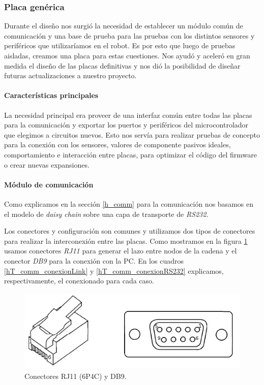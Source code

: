 \subsubsection{Placa gen\'erica}
\label{h_placas_generica}

Durante el dise\~no nos surgi\'o la necesidad de establecer un m\'odulo com\'un de comunicaci\'on y una base de prueba para
las pruebas con los distintos sensores y perif\'ericos que utilizar\'iamos en el robot.
Es por esto que luego de pruebas aisladas, creamos una placa para estas cuestiones.
Nos ayud\'o y aceler\'o en gran medida el dise\~no de las placas definitivas y nos di\'o la posibilidad de dise\~nar futuras
actualizaciones a nuestro proyecto.

\paragraph{Caracter\'isticas principales}
\label{h_placas_generica_caracteristicas}

La necesidad principal era proveer de una interfaz com\'un entre todas las placas para la comunicaci\'on y exportar
los puertos y perif\'ericos del microcontrolador que elegimos a circuitos nuevos.
Esto nos serv\'ia para realizar pruebas de concepto para la conexi\'on con los sensores, valores de componente pasivos
ideales, comportamiento e interacci\'on entre placas, para optimizar el c\'odigo del firmware o crear nuevas expansiones.

\paragraph{M\'odulo de comunicaci\'on}
\label{h_placas_generica_comm}

Como explicamos en la secci\'on \ref{h_comm} para la comunicaci\'on nos basamos en el modelo de \emph{daisy chain} sobre una
capa de transporte de \emph{RS232}.

Los conectores y configuraci\'on son comunes y utilizamos dos tipos de conectores para realizar la interconexi\'on entre las placas.
Como mostramos en la figura \ref{hF_placa_gen_comm} usamos conectores \emph{RJ11} para generar el lazo entre nodos de la cadena y el
conector \emph{DB9} para la conexi\'on con la PC.
En los cuadros \ref{hT_comm_conexionLink} y \ref{hT_comm_conexionRS232} explicamos, respectivamente, el conexionado para cada caso.

\begin{figure}[ht]
	\centering
	\includegraphics[scale=.25]{figuras/rj11_db9.png}
	\caption{Conectores RJ11 (6P4C) y DB9.}
	\label{hF_placa_gen_comm}
\end{figure}

